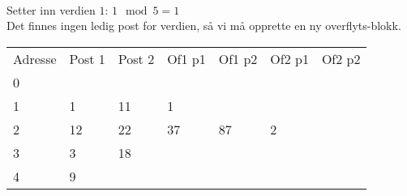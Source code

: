 ~\\
Setter inn verdien $1$: $1 \mod 5 = 1$\\
Det finnes ingen ledig post for verdien, så vi må opprette en ny overflyts-blokk.\\
\begin{tabular}{|l|l|l|l|l|l|l|}
    \hline
    Adresse & Post 1 & Post 2 & Of1 p1 & Of1 p2 & Of2 p1 & Of2 p2 \\
    0       & ~      & ~      &\cellcolor{gray}&\cellcolor{gray}&\cellcolor{gray}&\cellcolor{gray}\\
    1       & 1      & 11     & 1      & ~      &\cellcolor{gray}&\cellcolor{gray}\\
    2       & 12     & 22     & 37     & 87     & 2      & ~      \\
    3       & 3      & 18     &\cellcolor{gray}&\cellcolor{gray}&\cellcolor{gray}&\cellcolor{gray}\\
    4       & 9      & ~      &\cellcolor{gray}&\cellcolor{gray}&\cellcolor{gray}&\cellcolor{gray}\\ \hline
\end{tabular}

